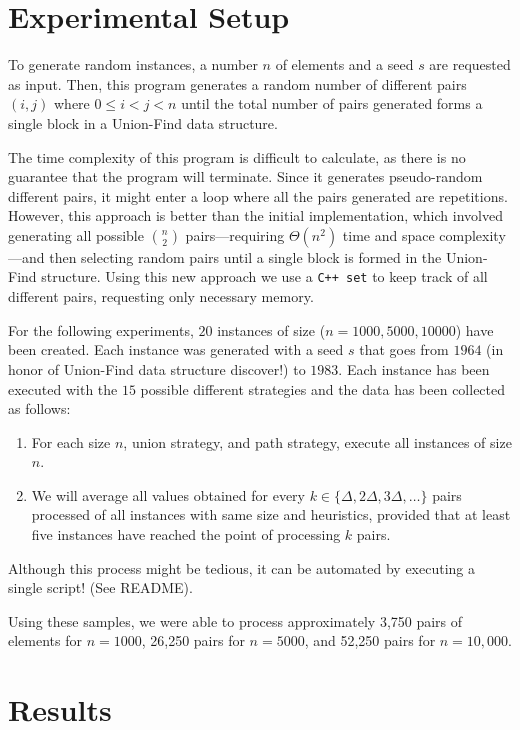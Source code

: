\section{Experimental Setup}
To generate random instances, a number \( n \) of elements and a seed \( s \) are requested as input. Then, this program generates a random number of different pairs \( (i, j) \) where \( 0 \leq i < j < n \) until the total number of pairs generated forms a single block in a Union-Find data structure. 

The time complexity of this program is difficult to calculate, as there is no guarantee that the program will terminate. Since it generates pseudo-random different pairs, it might enter a loop where all the pairs generated are repetitions. However, this approach is better than the initial implementation, which involved generating all possible \(n \choose 2 \) pairs—requiring \( \Theta(n^2) \) time and space complexity—and then selecting random pairs until a single block is formed in the Union-Find structure. Using this new approach we use a \texttt{C++ set} to keep track of all different pairs, requesting only necessary memory.

For the following experiments, $20$ instances of size ($n = 1000, 5000, 10000$) have been created. Each instance was generated with a seed $s$ that goes from $1964$ (in honor of Union-Find data structure discover\cite{galler1964improved}!) to $1983$. Each instance has been executed with the $15$ possible different strategies and the data has been collected as follows:

\begin{enumerate}
    \item For each size \( n \), union strategy, and path strategy, execute all instances of size \( n \).
    \item We will average all values obtained for every \( k \in \{\Delta, 2\Delta, 3\Delta, \ldots\} \) pairs processed of all instances with same size and heuristics, provided that at least five instances have reached the point of processing \( k \) pairs.
\end{enumerate}

Although this process might be tedious, it can be automated by executing a single script! (See README).

Using these samples, we were able to process approximately 3,750 pairs of elements for \( n = 1000 \), 26,250 pairs for \( n = 5000 \), and 52,250 pairs for \( n = 10,000 \).  

\section{Results}

